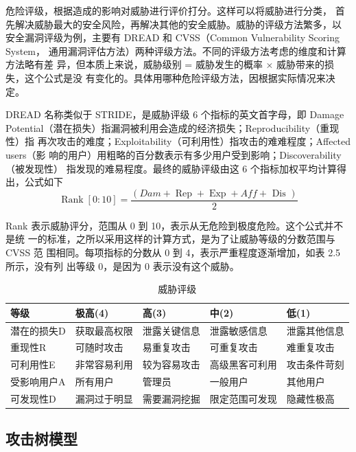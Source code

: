 危险评级，根据造成的影响对威胁进行评价打分。这样可以将威胁进行分类，
首先解决威胁最大的安全风险，再解决其他的安全威胁。威胁的评级方法繁多，以
安全漏洞评级为例，主要有 DREAD 和 CVSS（Common Vulnerability Scoring System，
通用漏洞评估方法）两种评级方法。不同的评级方法考虑的维度和计算方法略有差
异，但本质上来说，威胁级别 = 威胁发生的概率 × 威胁带来的损失，这个公式是没
有变化的。具体用哪种危险评级方法，因根据实际情况来决定。

DREAD 名称类似于 STRIDE，是威胁评级 6 个指标的英文首字母，即 Damage
Potential（潜在损失）指漏洞被利用会造成的经济损失；Reproducibility（重现性）指
再次攻击的难度；Exploitability（可利用性）指攻击的难难程度；Affected users（影
响的用户）用粗略的百分数表示有多少用户受到影响；Discoverability（被发现性）
指发现的难易程度。最终的威胁评级由这 6 个指标加权平均计算得出，公式如下
$$
\operatorname{Rank}[0: 10]=\frac{(D a m+\operatorname{Rep}+\operatorname{Exp}+A f f+\text { Dis })}{2}
$$


Rank 表示威胁评分，范围从 0 到 10，表示从无危险到极度危险。这个公式并不是统
一的标准，之所以采用这样的计算方式，是为了让威胁等级的分数范围与 CVSS 范
围相同。每项指标的分数从 0 到 4，表示严重程度逐渐增加，如表 2.5 所示，没有列
出等级 0，是因为 0 表示没有这个威胁。
\begin{table}
  \caption{威胁评级}
\begin{center}
  \begin{tabular}{|l|l|l|l|l|}
    \hline 等级 & 极高(4) & 高(3) & 中(2) & 低(1) \\
    \hline 潜在的损失D & 获取最高权限 & 泄露关键信息 & 泄露敏感信息 & 泄露其他信息 \\
    \hline 重现性R & 可随时攻击 & 易重复攻击 & 可重复攻击 & 难重复攻击 \\
    \hline 可利用性E & 非常容易利用 & 较为容易攻击 & 高级黑客可利用 & 攻击条件苛刻 \\
    \hline 受影响用户A & 所有用户 & 管理员 & 一般用户 & 其他用户 \\
    \hline 可发现性D & 漏洞过于明显 & 需要漏洞挖掘 & 限定范围可发现 & 隐藏性极高 \\
    \hline
    \end{tabular}
\end{center}
\end{table}

\subsection{攻击树模型}

